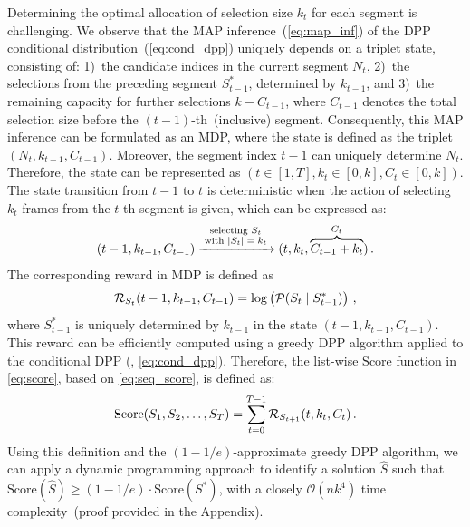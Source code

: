 Determining the optimal allocation of selection size \(k_t\) for each segment is challenging. 
%
We observe that the MAP inference~(\cref{eq:map_inf}) of the DPP conditional distribution~(\cref{eq:cond_dpp}) uniquely depends on a triplet state, consisting of:
1)~the candidate indices in the current segment \(N_t\),
2)~the selections from the preceding segment \(S_{t-1}^*\), determined by $k_{t-1}$, and
3)~the remaining capacity for further selections \(k - C_{t-1}\), where \(C_{t-1}\) denotes the total selection size before the \((t-1)\)-th~(inclusive) segment.
Consequently, this MAP inference can be formulated as an MDP, where the state is defined as the triplet \((N_t, k_{t-1}, C_{t-1})\).
Moreover, the segment index \(t-1\) can uniquely determine \(N_t\).
Therefore, the state can be represented as \((t \in [1, T], k_t \in [0, k], C_t \in [0, k])\).
The state transition from \(t-1\) to \(t\) is deterministic when the action of selecting \(k_t\) frames from the \(t\)-th segment is given, which can be expressed as:
\begin{equation}
	(t-1, k_{t-1}, C_{t-1})
	\xrightarrow{\hspace{-0.1cm}
		\scriptsize\begin{array}{c}
	        \text{selecting } S_t \\
	        \text{with } |S_t|=k_t
    	\end{array}
	\hspace{-0.1cm}}
	(t, k_t,\overbrace{C_{t-1}+ k_t}^{C_t})\,.
\end{equation}
The corresponding reward in MDP is defined as
\begin{equation}\label{eq:reward}
    \mathcal{R}_{S_t}(t-1, k_{t-1}, C_{t-1}) = \log \left(\mathcal{P}(S_t \mid S_{t-1}^*)\right) \,,
\end{equation}
where \(S_{t-1}^*\) is uniquely determined by \(k_{t-1}\) in the state $(t-1, k_{t-1}, C_{t-1})$.
This reward can be efficiently computed using a greedy DPP algorithm applied to the conditional DPP (\ie, \cref{eq:cond_dpp}).
%
Therefore, the list-wise \(\mathrm{Score}\) function in \cref{eq:score}, based on \cref{eq:seq_score}, is defined as:
\begin{equation}\label{eq:opt_score}
	\mathrm{Score}(S_1,S_2,\dots,S_T) =
		\sum_{t=0}^{T-1} \mathcal{R}_{S_{t+1}}(t, k_t, C_t)\,.
\end{equation}
Using this definition and the \((1 - 1/e)\)-approximate greedy DPP algorithm, we can apply a dynamic programming approach to identify a solution \(\hat{S}\) such that \mbox{\(\mathrm{Score}(\hat{S}) \geq (1 - 1/e) \cdot \mathrm{Score}(S^*)\)}, with a closely \(\mathcal{O}(nk^4)\) time complexity~(proof provided in the Appendix).

